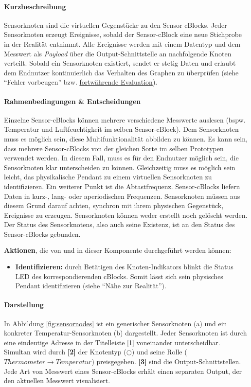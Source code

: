 \paragraph{Kurzbeschreibung}  Sensorknoten sind die virtuellen Gegenstücke zu den Sensor-cBlocks. Jeder Sensorknoten erzeugt Ereignisse, sobald der Sensor-cBlock eine neue Stichprobe in der Realität entnimmt. Alle Ereignisse werden mit einem Datentyp und dem Messwert als \textit{Payload} über die Output-Schnittstelle an nachfolgende Knoten verteilt. Sobald ein Sensorknoten existiert, sendet er stetig Daten und erlaubt dem Endnutzer kontinuierlich das Verhalten des Graphen zu überprüfen (siehe "`Fehler vorbeugen"' bzw. \hyperref[tab:cognitivedimensions]{fortwährende Evaluation}).

\paragraph{Rahmenbedingungen \& Entscheidungen} Einzelne Sensor-cBlocks können mehrere verschiedene Messwerte auslesen (bspw. Temperatur und Luftfeuchtigkeit im selben Sensor-cBlock). Dem Sensorknoten muss es möglich sein, diese Multifunktionalität abbilden zu können. Es kann sein, dass mehrere Sensor-cBlocks von der gleichen Sorte im selben Prototypen verwendet werden. In diesem Fall, muss es für den Endnutzer möglich sein, die Sensorknoten klar unterscheiden zu können. Gleichzeitig muss es möglich sein leicht, das  physikalische Pendant zu einem virtuellen Sensorknoten zu identifizieren. Ein weiterer Punkt ist die Abtastfrequenz. Sensor-cBlocks liefern Daten in kurz-, lang- oder aperiodischen Frequenzen. Sensorknoten müssen aus diesem Grund darauf achten, synchron mit ihrem physischen Gegenstück, Ereignisse zu erzeugen. Sensorknoten können weder erstellt noch gelöscht werden. Der Status des Sensorknotens, also auch seine Existenz, ist an den Status des Sensor-cBlocks gebunden.

\textbf{Aktionen}, die von und in dieser Komponente durchgeführt werden können: 
\begin{itemize}
    \item \textbf{Identifizieren:} durch Betätigen des Knoten-Indikators blinkt die Status LED des korrespondierenden cBlocks. Somit lässt sich sein physisches Pendant identifizieren (siehe "`Nähe zur Realität"').
\end{itemize}

\paragraph{Darstellung} In Abbildung \ref{fig:sensornodes} ist ein generischer Sensorknoten (a) und ein konkreter Temperatur-Sensorknoten (b) dargestellt. Jeder Sensorknoten ist durch eine eindeutige Adresse in der Titelleiste [1] voneinander unterscheidbar. Simultan wird durch \textbf{[2]} der Knotentyp ($\bigcirc$) und seine Rolle ($Thermometer \rightarrow Temperatur$) preisgegeben. \textbf{[3]} sind die Output-Schnittstellen. Jede Art von Messwert eines Sensor-cBlocks erhält einen separaten Output, der den aktuellen Messwert visualisiert. 

